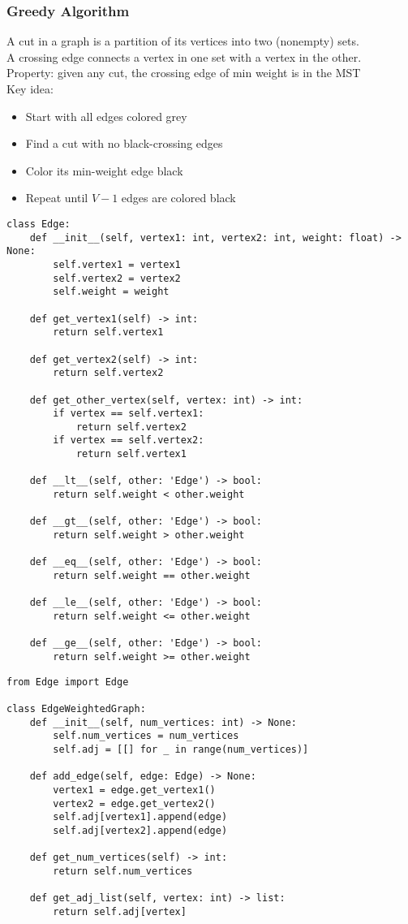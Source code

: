 \documentclass[a4paper]{article}
\begin{document}
\subsubsection*{Greedy Algorithm}
A cut in a graph is a partition of its vertices into two (nonempty) sets.\\
A crossing edge connects a vertex in one set with a vertex in the other.\\
Property: given any cut, the crossing edge of min weight is in the MST\\
Key idea:
\begin{itemize}
    \item Start with all edges colored grey
    \item Find a cut with no black-crossing edges
    \item Color its min-weight edge black
    \item Repeat until $V-1$ edges are colored black
\end{itemize}

\begin{lstlisting}
class Edge:
    def __init__(self, vertex1: int, vertex2: int, weight: float) -> None:
        self.vertex1 = vertex1
        self.vertex2 = vertex2
        self.weight = weight

    def get_vertex1(self) -> int:
        return self.vertex1

    def get_vertex2(self) -> int:
        return self.vertex2

    def get_other_vertex(self, vertex: int) -> int:
        if vertex == self.vertex1:
            return self.vertex2
        if vertex == self.vertex2:
            return self.vertex1

    def __lt__(self, other: 'Edge') -> bool:
        return self.weight < other.weight

    def __gt__(self, other: 'Edge') -> bool:
        return self.weight > other.weight

    def __eq__(self, other: 'Edge') -> bool:
        return self.weight == other.weight
    
    def __le__(self, other: 'Edge') -> bool:
        return self.weight <= other.weight
    
    def __ge__(self, other: 'Edge') -> bool:
        return self.weight >= other.weight
\end{lstlisting}

\begin{lstlisting}
from Edge import Edge

class EdgeWeightedGraph:
    def __init__(self, num_vertices: int) -> None:
        self.num_vertices = num_vertices
        self.adj = [[] for _ in range(num_vertices)]

    def add_edge(self, edge: Edge) -> None:
        vertex1 = edge.get_vertex1()
        vertex2 = edge.get_vertex2()
        self.adj[vertex1].append(edge)
        self.adj[vertex2].append(edge)

    def get_num_vertices(self) -> int:
        return self.num_vertices

    def get_adj_list(self, vertex: int) -> list:
        return self.adj[vertex]
\end{lstlisting}
\end{document}
